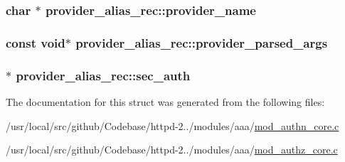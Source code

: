 \subsubsection[{\texorpdfstring{provider\+\_\+name}{provider_name}}]{\setlength{\rightskip}{0pt plus 5cm}char $\ast$ provider\+\_\+alias\+\_\+rec\+::provider\+\_\+name}\hypertarget{structprovider__alias__rec_a490e696df2a337330b9e522601cdeb04}{}\label{structprovider__alias__rec_a490e696df2a337330b9e522601cdeb04}
\subsubsection[{\texorpdfstring{provider\+\_\+parsed\+\_\+args}{provider_parsed_args}}]{\setlength{\rightskip}{0pt plus 5cm}const {\bf void}$\ast$ provider\+\_\+alias\+\_\+rec\+::provider\+\_\+parsed\+\_\+args}\hypertarget{structprovider__alias__rec_ae8227b3adce7cacf14d60f6cf6343804}{}\label{structprovider__alias__rec_ae8227b3adce7cacf14d60f6cf6343804}
\subsubsection[{\texorpdfstring{sec\+\_\+auth}{sec_auth}}]{ $\ast$ provider\+\_\+alias\+\_\+rec\+::sec\+\_\+auth}\hypertarget{structprovider__alias__rec_afaa3e3e6ba9798628c7d50bd0c5b258a}{}\label{structprovider__alias__rec_afaa3e3e6ba9798628c7d50bd0c5b258a}


The documentation for this struct was generated from the following files\+:\begin{DoxyCompactItemize}
\item 
/usr/local/src/github/\+Codebase/httpd-\/2../modules/aaa/\hyperlink{mod__authn__core_8c}{mod\+\_\+authn\+\_\+core.\+c}\item 
/usr/local/src/github/\+Codebase/httpd-\/2../modules/aaa/\hyperlink{mod__authz__core_8c}{mod\+\_\+authz\+\_\+core.\+c}\end{DoxyCompactItemize}
